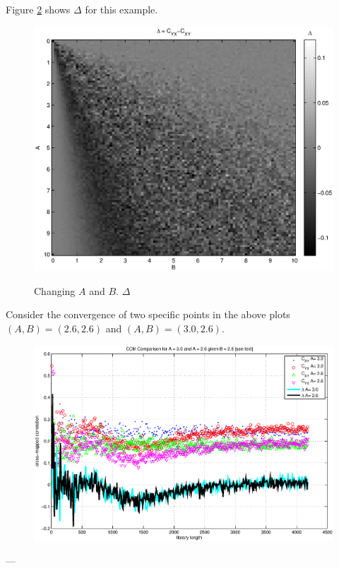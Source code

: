 \documentclass{article}
\begin{document}
Figure \ref{fig2} shows $\Delta$ for this example.
\begin{center}
\begin{figure}[H]
\includegraphics[scale=0.7]{LinearEx_Delta.eps} \\
\caption{Changing $A$ and $B$. $\Delta$}
\label{fig2}
\end{figure}
\end{center}
Consider the convergence of two specific points in the above plots $(A,B) = (2.6,2.6)$ and $(A,B)=(3.0,2.6)$.
\begin{center}
\begin{figure}[H]
\includegraphics[scale=0.7]{LinearEx_ChangeL.eps} \\
\caption{}
\label{fig2}
\end{figure}
\end{center}
---
\end{document}
